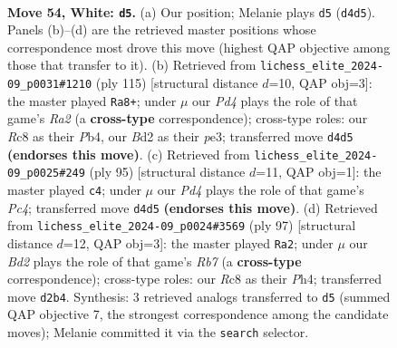 \documentclass[11pt]{article}
\begin{document}
\clearpage

\begin{figure}[p]\centering
\begin{subfigure}{0.46\textwidth}\centering
\resizebox{\linewidth}{!}{%
\newchessgame
\chessboard[
  setfen={2R5/7r/r4k2/1p6/3PK3/1p6/3B4/8 w - - 2 54},
  showmover=false,
  pgfstyle=straightmove, color=movearrow, markmove={d4-d5}
]}
\caption{}
\end{subfigure}\hfill
\begin{subfigure}{0.46\textwidth}\centering
\resizebox{\linewidth}{!}{%
\newchessgame
\chessboard[
  setfen={5K1k/r7/8/2p3P1/1p6/4P3/5R2/8 b - - 0 58},
  showmover=false,
  pgfstyle=straightmove, color=movearrow, markmove={a7-a8}
]}
\caption{}
\end{subfigure}
\\[4pt]
\begin{subfigure}{0.46\textwidth}\centering
\resizebox{\linewidth}{!}{%
\newchessgame
\chessboard[
  setfen={8/7b/5K1P/1kp5/8/6r1/7R/8 b - - 5 48},
  showmover=false,
  pgfstyle=straightmove, color=movearrow, markmove={c5-c4}
]}
\caption{}
\end{subfigure}\hfill
\begin{subfigure}{0.46\textwidth}\centering
\resizebox{\linewidth}{!}{%
\newchessgame
\chessboard[
  setfen={8/P1K2pk1/8/6p1/7p/8/1r6/2R5 b - - 2 49},
  showmover=false,
  pgfstyle=straightmove, color=movearrow, markmove={b2-a2}
]}
\caption{}
\end{subfigure}
\caption{\textbf{Move 54, White: \texttt{d5}.} (a) Our position; Melanie plays \texttt{d5} (\texttt{d4d5}). Panels (b)--(d) are the retrieved master positions whose correspondence most drove this move (highest QAP objective among those that transfer to it). (b) Retrieved from \texttt{lichess\_elite\_2024-09\_p0031\#1210} (ply 115) [structural distance $d$=10, QAP obj=3]: the master played \texttt{Ra8+}; under $\mu$ our \emph{Pd4} plays the role of that game's \emph{Ra2} (a \textbf{cross-type} correspondence); cross-type roles: our \emph{R}c8 as their \emph{P}b4, our \emph{B}d2 as their \emph{p}e3; transferred move \texttt{d4d5} \textbf{(endorses this move)}. (c) Retrieved from \texttt{lichess\_elite\_2024-09\_p0025\#249} (ply 95) [structural distance $d$=11, QAP obj=1]: the master played \texttt{c4}; under $\mu$ our \emph{Pd4} plays the role of that game's \emph{Pc4}; transferred move \texttt{d4d5} \textbf{(endorses this move)}. (d) Retrieved from \texttt{lichess\_elite\_2024-09\_p0024\#3569} (ply 97) [structural distance $d$=12, QAP obj=3]: the master played \texttt{Ra2}; under $\mu$ our \emph{Bd2} plays the role of that game's \emph{Rb7} (a \textbf{cross-type} correspondence); cross-type roles: our \emph{R}c8 as their \emph{P}h4; transferred move \texttt{d2b4}. Synthesis: 3 retrieved analogs transferred to \texttt{d5} (summed QAP objective 7, the strongest correspondence among the candidate moves); Melanie committed it via the \texttt{search} selector.}
\label{fig:thought-m106}
\end{figure}
\end{document}
